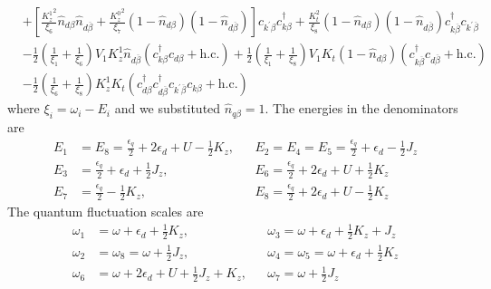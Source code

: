 \documentclass[twoside,11pt]{report}
\numberwithin{equation}{section}
\begin{document}
\begin{equation}
\begin{aligned}
&+ \left[\frac{{K_z^1}^2}{\xi_6}\hat n_{d\beta}\hat n_{d\overline\beta} + \frac{{K_z^0}^2}{\xi_7}\left(1 - \hat n_{d\beta}\right)\left(1 - \hat n_{d\overline\beta}\right)\right]c_{k^\prime\beta}c^\dagger_{k\beta} + \frac{K_t^2}{\xi_8}\left(1 - \hat n_{d\beta}\right)\left(1 - \hat n_{d\overline\beta}\right)c^\dagger_{k\overline\beta}c_{k^\prime\overline\beta}\\
&- \frac{1}{2}\left(\frac{1}{\xi_1} + \frac{1}{\xi_6} \right)V_1 K_z^1 \hat n_{d\overline\beta}\left(c^\dagger_{k\beta}c_{d\beta} + \text{h.c.}\right) + \frac{1}{2}\left(\frac{1}{\xi_1} + \frac{1}{\xi_8} \right)V_1 K_t \left(1 - \hat n_{d\beta}\right)\left(c^\dagger_{k\overline\beta}c_{d\overline\beta} + \text{h.c.}\right)\\
&- \frac{1}{2}\left(\frac{1}{\xi_6} + \frac{1}{\xi_8} \right)K_z^1 K_t \left(c^\dagger_{d\beta}c^\dagger_{d\overline\beta}c_{k^\prime\overline\beta}c_{k\beta} + \text{h.c.}\right)
\end{aligned}\end{equation}
where \(\xi_i = \omega_i - E_i\) and we substituted \(\hat n_{q\beta}=1\). The energies in the denominators are
\begin{equation}\begin{aligned}
E_1&= E_8 = \frac{\epsilon_q}{2} + 2\epsilon_d+ U - \frac{1}{2}K_z, &&E_2 = E_4 = E_5 = \frac{\epsilon_q}{2} + \epsilon_d - \frac{1}{2}J_z\\
E_3&=\frac{\epsilon_q}{2} + \epsilon_d + \frac{1}{2}J_z, &&E_6 =\frac{\epsilon_q}{2} + 2\epsilon_d+ U + \frac{1}{2}K_z\\
E_7&=\frac{\epsilon_q}{2} - \frac{1}{2}K_z, &&E_8=\frac{\epsilon_q}{2}+2\epsilon_d+ U  - \frac{1}{2}K_z
\end{aligned}\end{equation}
The quantum fluctuation scales are
\begin{equation}\begin{aligned}
\omega_1&=\omega + \epsilon_d+\frac{1}{2}K_z, &&\omega_3 =\omega+\epsilon_d + \frac{1}{2}K_z + J_z\\
\omega_2& = \omega_8 = \omega+\frac{1}{2}J_z, &&\omega_4 = \omega_5 = \omega + \epsilon_d + \frac{1}{2}K_z\\
\omega_6&=\omega+2\epsilon_d+U+\frac{1}{2}J_z + K_z, &&\omega_7 =\omega+\frac{1}{2}J_z\\
\end{aligned}\end{equation}
\end{document}
